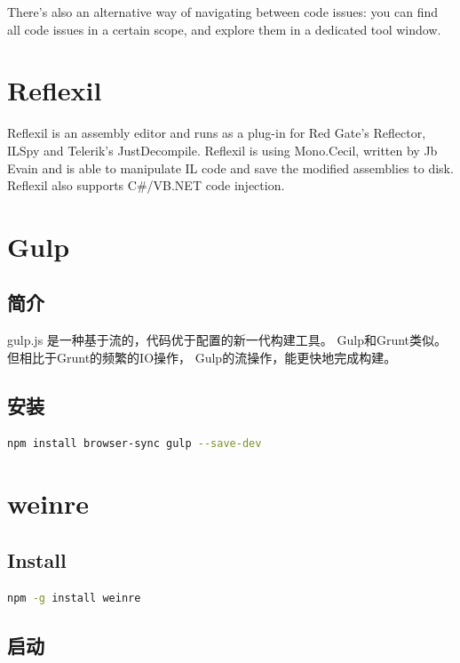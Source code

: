 \documentclass{book}
\begin{document}
There's also an alternative way of navigating between code issues: 
you can find all code issues in a certain scope, and explore them in a dedicated tool window.

\section{Reflexil}

Reflexil is an assembly editor and runs as a plug-in for Red Gate's Reflector, 
ILSpy and Telerik's JustDecompile. 
Reflexil is using Mono.Cecil, 
written by Jb Evain and is able to manipulate IL code and save the modified assemblies to disk. Reflexil also supports C\#/VB.NET code injection.



\section{Gulp}

\subsection{简介}

gulp.js 是一种基于流的，代码优于配置的新一代构建工具。
Gulp和Grunt类似。但相比于Grunt的频繁的IO操作，
Gulp的流操作，能更快地完成构建。

\subsection{安装}

\begin{lstlisting}[language=bash]
npm install browser-sync gulp --save-dev
\end{lstlisting}

\section{weinre}

\subsection{Install}

\begin{lstlisting}[language=bash]
npm -g install weinre
\end{lstlisting}

\subsection{启动}
\end{document}
